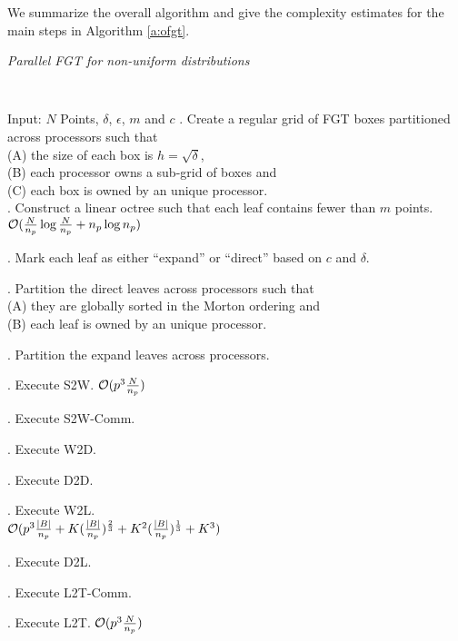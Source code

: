 We summarize the overall algorithm and give the complexity estimates for the main steps in Algorithm \ref{a:ofgt}.  

\begin{algorithm}[!h]
\caption{ \label{a:ofgt}
\em Parallel FGT for non-uniform distributions}
{\tt
\begin{algorithmic}
\STATE Input: $N$ Points, $\delta$, $\epsilon$, $m$ and $c$
. Create a regular grid of FGT boxes partitioned across processors such that \\
 (A) the size of each box is $h = \sqrt{\delta}$, \\
 (B) each processor owns a sub-grid of boxes and \\
 (C) each box is owned by an unique processor. \\

. Construct a linear octree such that each leaf contains fewer than $m$ points. \\
\hfill $\mathcal{O}(\frac{N}{n_p} \log{\frac{N}{n_p}} + n_p \log{n_p})$

. Mark each leaf as either ``expand'' or ``direct'' based on $c$ and $\delta$.

. Partition the direct leaves across processors such that \\
  (A) they are globally sorted in the Morton ordering and \\
  (B) each leaf is owned by an unique processor.

. Partition the expand leaves across processors. 

. Execute S2W. \hfill $\mathcal{O}(p^3 \frac{N}{n_p})$

. Execute S2W-Comm. 

. Execute W2D. 

. Execute D2D. 

. Execute W2L. \\
 \hfill $\mathcal{O}(p^3 \frac{|B|}{n_p} + K (\frac{|B|}{n_p})^{\frac{2}{3}} + K^2(\frac{|B|}{n_p})^{\frac{1}{3}} + K^3 )$ 

. Execute D2L. 

. Execute L2T-Comm. 

. Execute L2T. \hfill $\mathcal{O}( p^3\frac{N}{n_p})$
\end{algorithmic}
}
\end{algorithm}


